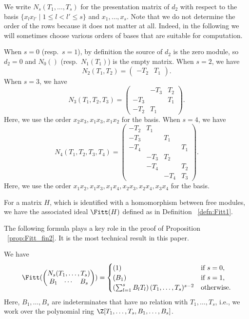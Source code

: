 We write $N_s(T_1, \dots, T_s)$ for the presentation matrix of $d_2$ with respect to the basis $\{x_l x_{l'} \mid 1 \leq l < l' \leq s \}$ and $x_1, \dots, x_s$.
Note that we do not determine the order of the rows because it does not matter at all.
Indeed, in the following we will sometimes choose various orders of bases that are suitable for computation.

\begin{exam}
When $s = 0$ (resp.~$s = 1$), by definition the source of $d_2$ is the zero module, so $d_2 = 0$ and $N_0()$ (resp.~$N_1(T_1)$) is the empty matrix.
When $s = 2$, we have 
\[
N_2(T_1, T_2) = \begin{pmatrix} -T_2 & T_1 \end{pmatrix}.
\]
When $s = 3$, we have
\[
N_3(T_1, T_2, T_3) = 
\begin{pmatrix}
& - T_3 & T_2\\
- T_3 & & T_1\\
- T_2 & T_1 &
\end{pmatrix}.
\]
Here, we use the order $x_2x_3, x_1x_3, x_1x_2$ for the basis.
When $s = 4$, we have
\[
N_4(T_1, T_2, T_3, T_4) = 
\begin{pmatrix}
-T_2 & T_1 &  & \\
- T_3 & & T_1 & \\
- T_4 & & & T_1\\
& - T_3 & T_2 & \\
& -T_4 & & T_2\\
& & -T_4 & T_3
\end{pmatrix}.
\]
Here, we use the order $x_1 x_2, x_1x_3, x_1x_4, x_2x_3, x_2x_4, x_3x_4$ for the basis.
\end{exam}

For a matrix $H$, which is identified with a homomorphism between free modules, we have the associated ideal $\Fitt(H)$ defined as in Definition ~\ref{defn:Fitt1}.

The following formula plays a key role in the proof of Proposition ~\ref{prop:Fitt_fin2}.
It is the most technical result in this paper.

\begin{prop}\label{prop:Fitt_p2}
We have
\[
\Fitt(\begin{pmatrix} N_s(T_1, \dots, T_s) \\ \begin{matrix} B_1 & \cdots & B_s \end{matrix} \end{pmatrix})
= \begin{cases}
(1) & \text{if $s = 0$,}\\
(B_1) & \text{if $s = 1$,}\\
\left( \sum_{l=1}^s B_l T_l \right)(T_1, \dots, T_s)^{s - 2} & \text{otherwise.}
\end{cases}
\]
Here, $B_1, \dots, B_s$ are indeterminates that have no relation with $T_1, \dots, T_s$, i.e., we work over the polynomial ring $\Z[T_1, \dots, T_s, B_1, \dots, B_s]$.
\end{prop}

